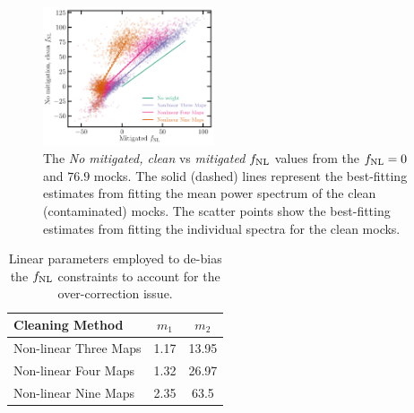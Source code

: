 \begin{figure}
\centering
\includegraphics[width=0.45\textwidth]{figures/fnlbias}
\caption{The \textit{No mitigated, clean} vs \textit{mitigated} $f_{\rm NL}$ values from the $f_{\rm NL}=0$ and $76.9$ mocks. The solid (dashed) lines represent the best-fitting estimates from fitting the mean power spectrum of the clean (contaminated) mocks. The scatter points show the best-fitting estimates from fitting the individual spectra for the clean mocks.}\label{fig:fnlbias}
\end{figure}

\begin{table}
\begin{center}
\caption{Linear parameters employed to de-bias the $f_{\rm NL}$ constraints to account for the over-correction issue. }\label{tab:debiasparams}
\begin{tabular}{lcc}
\hline
\hline
\textbf{Cleaning Method} & $m_{1}$ & $m_{2}$ \\
\hline
Non-linear Three Maps & 1.17 & 13.95 \\
Non-linear Four Maps & 1.32 & 26.97 \\
Non-linear Nine Maps & 2.35 & 63.5\\
\hline
\end{tabular}
\end{center}
\end{table}